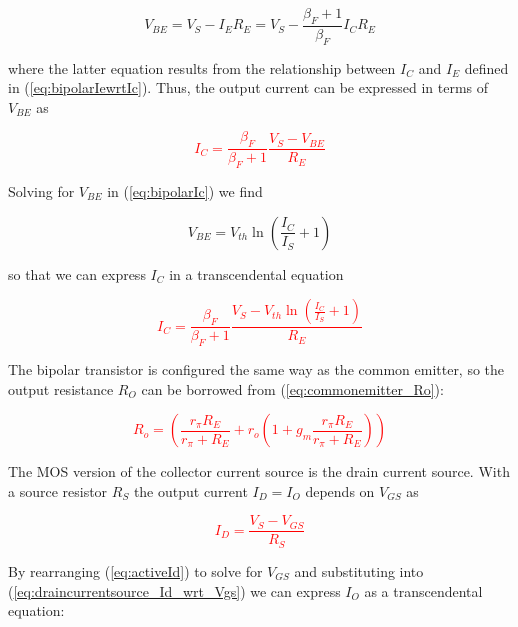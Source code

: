 \begin{equation}
V_{BE} = V_{S} - I_{E}R_{E} = V_{S} - \frac{\beta_{F}+1}{\beta_{F}}I_{C}R_{E}
\end{equation}

\noindent where the latter equation results from the relationship between $I_{C}$ and $I_{E}$ defined in (\ref{eq:bipolarIewrtIc}). Thus, the output current can be expressed in terms of $V_{BE}$ as

\textcolor{red}{
\begin{equation}
I_{C} = \frac{\beta_{F}}{\beta_{F}+1}\frac{V_{S}-V_{BE}}{R_{E}}
\label{eq:collector_currentsource_Ic_wrt_Vbe}
\end{equation}
}

\noindent Solving for $V_{BE}$ in (\ref{eq:bipolarIc}) we find

\begin{equation}
V_{BE} = V_{th}\ln\left(\frac{I_{C}}{I_{S}}+1\right)
\end{equation}

\noindent so that we can express $I_{C}$ in a transcendental equation

\textcolor{red}{
\begin{equation}
I_{C} = \frac{\beta_{F}}{\beta_{F}+1} \frac{V_{S}-V_{th}\ln\left(\frac{I_{C}}{I_{S}}+1\right)}{R_{E}}
\end{equation}
}

The bipolar transistor is configured the same way as the common emitter, so the output resistance $R_{O}$ can be borrowed from (\ref{eq:commonemitter_Ro}):

\textcolor{red}{
\begin{equation}
R_{o} = \left(\frac{r_{\pi}R_{E}}{r_{\pi}+R_{E}} + r_{o}\left(1+g_{m}\frac{r_{\pi}R_{E}}{r_{\pi}+R_{E}}\right)\right)
\end{equation}
}

The MOS version of the collector current source is the drain current source. With a source resistor $R_{S}$ the output current $I_{D} = I_{O}$ depends on $V_{GS}$ as

\textcolor{red}{
\begin{equation}
I_{D} = \frac{V_{S}-V_{GS}}{R_{S}}
\label{eq:draincurrentsource_Id_wrt_Vgs}
\end{equation}
}

\noindent By rearranging (\ref{eq:activeId}) to solve for $V_{GS}$ and substituting into (\ref{eq:draincurrentsource_Id_wrt_Vgs}) we can express $I_{O}$ as a transcendental equation:

